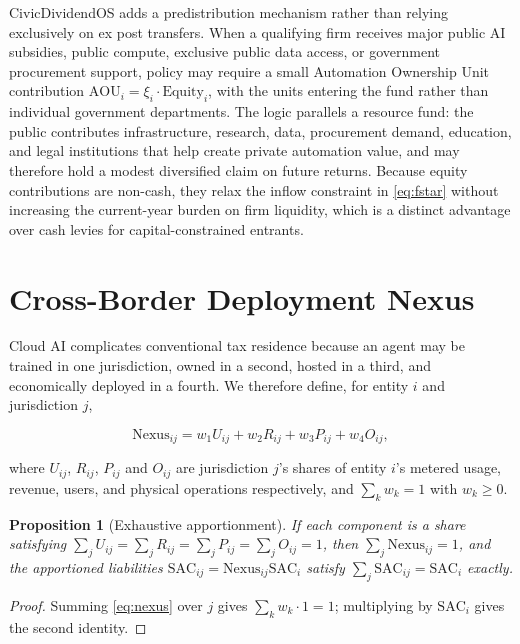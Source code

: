 \documentclass[journal]{IEEEtran}
\theoremstyle{plain}
\newtheorem{proposition}{Proposition}
\theoremstyle{definition}
\newcommand{\SAC}{\mathrm{SAC}}
\begin{document}
CivicDividendOS adds a predistribution mechanism rather than relying exclusively on ex post transfers. When a qualifying firm receives major public AI subsidies, public compute, exclusive public data access, or government procurement support, policy may require a small Automation Ownership Unit contribution $\mathrm{AOU}_i = \xi_i \cdot \mathrm{Equity}_i$, with the units entering the fund rather than individual government departments. The logic parallels a resource fund: the public contributes infrastructure, research, data, procurement demand, education, and legal institutions that help create private automation value, and may therefore hold a modest diversified claim on future returns. Because equity contributions are non-cash, they relax the inflow constraint in \eqref{eq:fstar} without increasing the current-year burden on firm liquidity, which is a distinct advantage over cash levies for capital-constrained entrants.

\section{Cross-Border Deployment Nexus}
\label{sec:nexus}

Cloud AI complicates conventional tax residence because an agent may be trained in one jurisdiction, owned in a second, hosted in a third, and economically deployed in a fourth. We therefore define, for entity $i$ and jurisdiction $j$,

\begin{equation}
\label{eq:nexus}
\mathrm{Nexus}_{ij} = w_1 U_{ij} + w_2 R_{ij} + w_3 P_{ij} + w_4 O_{ij},
\end{equation}

where $U_{ij}$, $R_{ij}$, $P_{ij}$ and $O_{ij}$ are jurisdiction $j$'s shares of entity $i$'s metered usage, revenue, users, and physical operations respectively, and $\sum_k w_k = 1$ with $w_k \ge 0$.

\begin{proposition}[Exhaustive apportionment]
\label{prop:nexus}
If each component is a share satisfying $\sum_j U_{ij} = \sum_j R_{ij} = \sum_j P_{ij} = \sum_j O_{ij} = 1$, then $\sum_j \mathrm{Nexus}_{ij} = 1$, and the apportioned liabilities $\SAC_{ij} = \mathrm{Nexus}_{ij}\SAC_i$ satisfy $\sum_j \SAC_{ij} = \SAC_i$ exactly.
\end{proposition}

\begin{proof}
Summing \eqref{eq:nexus} over $j$ gives $\sum_k w_k \cdot 1 = 1$; multiplying by $\SAC_i$ gives the second identity.
\end{proof}
\end{document}
